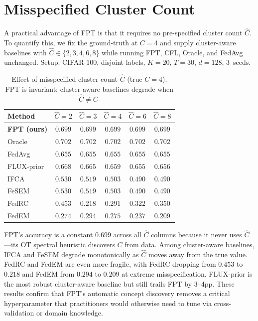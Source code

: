 \documentclass[11pt]{article}
\begin{document}
\section{Misspecified Cluster Count}
\label{app:misspecified_c}

A practical advantage of FPT is that it requires no pre-specified cluster count $\hat C$.
To quantify this, we fix the ground-truth at $C{=}4$ and supply cluster-aware baselines with $\hat C \in \{2, 3, 4, 6, 8\}$ while running FPT, CFL, Oracle, and FedAvg unchanged.
Setup: CIFAR-100, disjoint labels, $K{=}20$, $T{=}30$, $d{=}128$, 3~seeds.

\begin{table}[h]
\centering
\caption{Effect of misspecified cluster count $\hat C$ (true $C{=}4$).
FPT is invariant; cluster-aware baselines degrade when $\hat C \ne C$.}
\label{tab:misspec}
\small
\begin{tabular}{lccccc}
\toprule
Method & $\hat C{=}2$ & $\hat C{=}3$ & $\hat C{=}4$ & $\hat C{=}6$ & $\hat C{=}8$ \\
\midrule
\textbf{FPT (ours)} & $\mathbf{0.699}$ & $\mathbf{0.699}$ & $\mathbf{0.699}$ & $\mathbf{0.699}$ & $\mathbf{0.699}$ \\
Oracle               & $0.702$ & $0.702$ & $0.702$ & $0.702$ & $0.702$ \\
FedAvg               & $0.655$ & $0.655$ & $0.655$ & $0.655$ & $0.655$ \\
\midrule
FLUX-prior           & $0.668$ & $0.665$ & $0.659$ & $0.655$ & $0.656$ \\
IFCA                 & $0.530$ & $0.519$ & $0.503$ & $0.490$ & $0.490$ \\
FeSEM                & $0.530$ & $0.519$ & $0.503$ & $0.490$ & $0.490$ \\
FedRC                & $0.453$ & $0.218$ & $0.291$ & $0.322$ & $0.350$ \\
FedEM                & $0.274$ & $0.294$ & $0.275$ & $0.237$ & $0.209$ \\
\bottomrule
\end{tabular}
\end{table}

FPT's accuracy is a constant $0.699$ across all $\hat C$ columns because it never uses $\hat C$---its OT spectral heuristic discovers $C$ from data.
Among cluster-aware baselines, IFCA and FeSEM degrade monotonically as $\hat C$ moves away from the true value.
FedRC and FedEM are even more fragile, with FedRC dropping from $0.453$ to $0.218$ and FedEM from $0.294$ to $0.209$ at extreme misspecification.
FLUX-prior is the most robust cluster-aware baseline but still trails FPT by 3--4pp.
These results confirm that FPT's automatic concept discovery removes a critical hyperparameter that practitioners would otherwise need to tune via cross-validation or domain knowledge.
\end{document}
